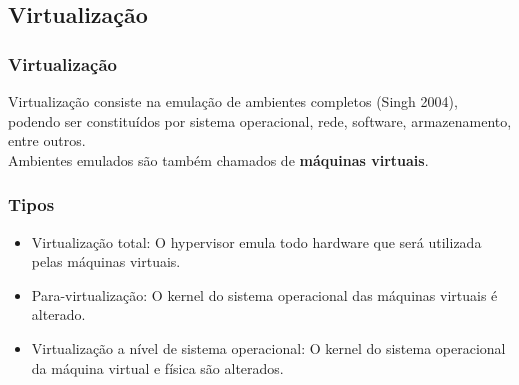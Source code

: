 \documentclass{beamer}
\begin{document}
    \subsection{Virtualização}
    \begin{frame}
     \frametitle{Virtualização}
     Virtualização consiste na emulação de ambientes completos (Singh 2004), podendo ser constituídos por sistema operacional, rede, software, armazenamento, entre outros.\\
     Ambientes emulados são também chamados de \textbf{máquinas virtuais}.
    \end{frame}

    \begin{frame}
     \frametitle{Tipos}
     \begin{itemize}
      \item Virtualização total: O hypervisor emula todo hardware que será utilizada pelas máquinas virtuais.
      \item Para-virtualização: O kernel do sistema operacional das máquinas virtuais é alterado.
      \item Virtualização a nível de sistema operacional: O kernel do sistema operacional da máquina virtual e física são alterados.
     \end{itemize}

    \end{frame}
\end{document}
